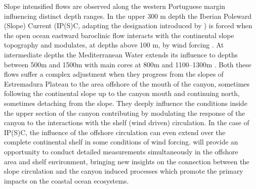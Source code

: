 \begin{description}
Slope intensified flows are observed along the western Portuguese
margin influencing distinct depth ranges. In the upper 300 m depth the
Iberian Poleward (Slope) Current (IP(S)C, adapting the designation
introduced by \cite{peliz03}) is forced when the open ocean eastward
baroclinic flow interacts with the continental slope topography and
modulates, at depths above 100 m, by wind forcing
\cite{frouin90,haynes90}. At intermediate depths the Mediterranean
Water extends its influence to depths between 500m and 1500m with main
cores at 800m and 1100--1300m \cite{fiuza98}. Both these flows suffer
a complex adjustment when they progress from the slopes of Estremadura
Plateau to the area offshore of the mouth of the \naz canyon,
sometimes following the continental slope up to the canyon mouth and
continuing north, sometimes detaching from the slope. They deeply
influence the conditions inside the upper section of the canyon
contributing by modulating the response of the canyon to the
interactions with the shelf (wind driven) circulation. In the case of
IP(S)C, the influence of the offshore circulation can even extend over
the complete continental shelf in some conditions of wind
forcing. \proj will provide an opportunity to conduct detailed
measurements simultaneously in the offshore area and shelf
environment, bringing new insights on the connection between the slope
circulation and the canyon induced processes which promote the primary
impacts on the coastal ocean ecosystems.




\end{description}  